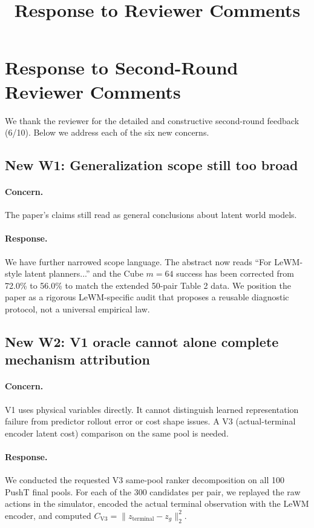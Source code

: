 \documentclass[11pt]{article}
\title{Response to Reviewer Comments}
\author{}
\date{}
\newcommand{\CVthree}{C_{\mathrm{V3}}}
\begin{document}
\maketitle

\section*{Response to Second-Round Reviewer Comments}

We thank the reviewer for the detailed and constructive second-round feedback (6/10). Below we address each of the six new concerns.

\subsection*{New W1: Generalization scope still too broad}

\paragraph{Concern.}
The paper's claims still read as general conclusions about latent world models.

\paragraph{Response.}
We have further narrowed scope language. The abstract now reads ``For LeWM-style latent planners...'' and the Cube $m=64$ success has been corrected from 72.0\% to 56.0\% to match the extended 50-pair Table 2 data. We position the paper as a rigorous LeWM-specific audit that proposes a reusable diagnostic protocol, not a universal empirical law.

\subsection*{New W2: V1 oracle cannot alone complete mechanism attribution}

\paragraph{Concern.}
V1 uses physical variables directly. It cannot distinguish learned representation failure from predictor rollout error or cost shape issues. A V3 (actual-terminal encoder latent cost) comparison on the same pool is needed.

\paragraph{Response.}
We conducted the requested V3 same-pool ranker decomposition on all 100 PushT final pools. For each of the 300 candidates per pair, we replayed the raw actions in the simulator, encoded the actual terminal observation with the LeWM encoder, and computed $\CVthree=\|z_\mathrm{terminal}-z_g\|_2^2$.
\end{document}

